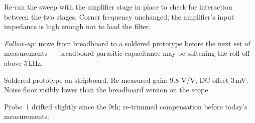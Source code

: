 \documentclass[a5paper,10pt,idxtotoc]{labbook}
\begin{document}
Re-ran the sweep with the amplifier stage in place to check for interaction
between the two stages. Corner frequency unchanged; the amplifier's input
impedance is high enough not to load the filter.

\textit{Follow-up:} move from breadboard to a soldered prototype before the
next set of measurements --- breadboard parasitic capacitance may be
softening the roll-off above 5\,kHz.


Soldered prototype on stripboard. Re-measured gain: 9.8 V/V, DC offset
3\,mV. Noise floor visibly lower than the breadboard version on the scope.

Probe~1 drifted slightly since the 9th; re-trimmed compensation before
today's measurements.
\end{document}
